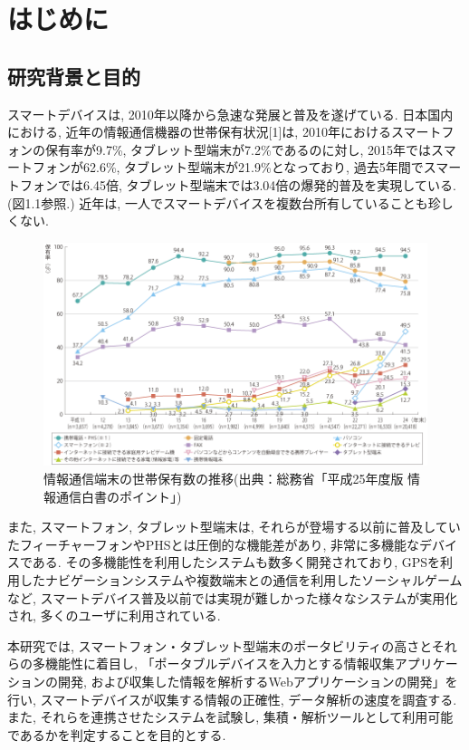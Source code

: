 \chapter{はじめに}
\label{chap:introduction}

\section{研究背景と目的}
スマートデバイスは, 2010年以降から急速な発展と普及を遂げている.
日本国内における, 近年の情報通信機器の世帯保有状況[1]は, 2010年におけるスマートフォンの保有率が9.7\%, タブレット型端末が7.2\%であるのに対し, 2015年ではスマートフォンが62.6\%, タブレット型端末が21.9\%となっており, 過去5年間でスマートフォンでは6.45倍, タブレット型端末では3.04倍の爆発的普及を実現している.(図1.1参照.)
近年は, 一人でスマートデバイスを複数台所有していることも珍しくない.

\begin{figure}
\begin{center}
\includegraphics[width=16cm]{fig/n4301010.png}
\end{center}
\caption{情報通信端末の世帯保有数の推移(出典：総務省「平成25年度版 情報通信白書のポイント」)}
\end{figure}

また, スマートフォン, タブレット型端末は, それらが登場する以前に普及していたフィーチャーフォンやPHSとは圧倒的な機能差があり, 非常に多機能なデバイスである.
その多機能性を利用したシステムも数多く開発されており, GPSを利用したナビゲーションシステムや複数端末との通信を利用したソーシャルゲームなど, スマートデバイス普及以前では実現が難しかった様々なシステムが実用化され, 多くのユーザに利用されている.

本研究では, スマートフォン・タブレット型端末のポータビリティの高さとそれらの多機能性に着目し, 「ポータブルデバイスを入力とする情報収集アプリケーションの開発, および収集した情報を解析するWebアプリケーションの開発」を行い, スマートデバイスが収集する情報の正確性, データ解析の速度を調査する.
また, それらを連携させたシステムを試験し, 集積・解析ツールとして利用可能であるかを判定することを目的とする.

